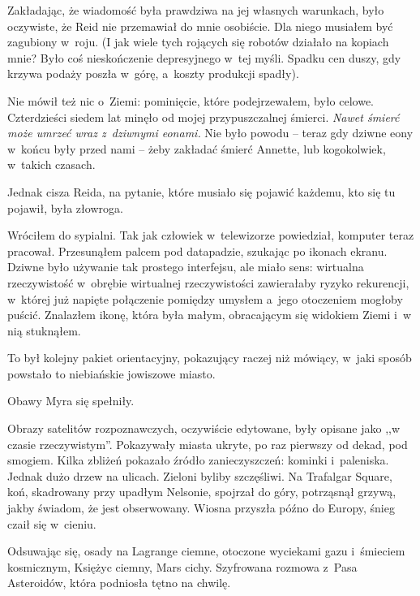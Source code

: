 \documentclass[oneside,polish,11pt,sfheadings]{mwbk}
\let\footnote=\endnote
\begin{document}
Zakładając, że wiadomość była prawdziwa na jej własnych warunkach, było
oczywiste, że Reid nie przemawiał do mnie osobiście. Dla niego musiałem
być zagubiony w~roju. (I jak wiele tych rojących się robotów działało na
kopiach mnie? Było coś nieskończenie depresyjnego w~tej myśli. Spadku
cen duszy, gdy krzywa podaży poszła w~górę, a~koszty produkcji spadły).

Nie mówił też nic o~Ziemi: pominięcie, które podejrzewałem, było celowe.
Czterdzieści siedem lat minęło od mojej przypuszczalnej śmierci. \emph{Nawet
śmierć może umrzeć wraz z~dziwnymi eonami\footnote{ cytat z~,,Zew Cthulhu''
H.P. Lovecraft -- przyp.tłum.}.} Nie było powodu -- teraz gdy dziwne eony w~końcu były przed nami -- żeby zakładać śmierć Annette, lub kogokolwiek, w~takich czasach.

Jednak cisza Reida, na pytanie, które musiało się pojawić każdemu, kto
się tu pojawił, była złowroga.

Wróciłem do sypialni. Tak jak człowiek w~telewizorze powiedział,
komputer teraz pracował. Przesunąłem palcem pod datapadzie, szukając po
ikonach ekranu. Dziwne było używanie tak prostego interfejsu, ale miało
sens: wirtualna rzeczywistość w~obrębie wirtualnej rzeczywistości
zawierałaby ryzyko rekurencji, w~której już napięte połączenie pomiędzy
umysłem a~jego otoczeniem mogłoby puścić. Znalazłem ikonę, która była
małym, obracającym się widokiem Ziemi i~w nią stuknąłem.

To był kolejny pakiet orientacyjny, pokazujący raczej niż mówiący, w~jaki sposób powstało to niebiańskie jowiszowe miasto.

Obawy Myra się spełniły.

Obrazy satelitów rozpoznawczych, oczywiście edytowane, były opisane jako
,,w czasie rzeczywistym''. Pokazywały miasta ukryte, po raz pierwszy od
dekad, pod smogiem. Kilka zbliżeń pokazało źródło zanieczyszczeń:
kominki i~paleniska. Jednak dużo drzew na ulicach. Zieloni byliby
szczęśliwi. Na Trafalgar Square, koń, skadrowany przy upadłym Nelsonie,
spojrzał do góry, potrząsnął grzywą, jakby świadom, że jest obserwowany.
Wiosna przyszła późno do Europy, śnieg czaił się w~cieniu.

Odsuwając się, osady na Lagrange ciemne, otoczone wyciekami gazu i~śmieciem kosmicznym, Księżyc ciemny, Mars cichy. Szyfrowana rozmowa z~Pasa Asteroidów, która podniosła tętno na chwilę.
\end{document}
